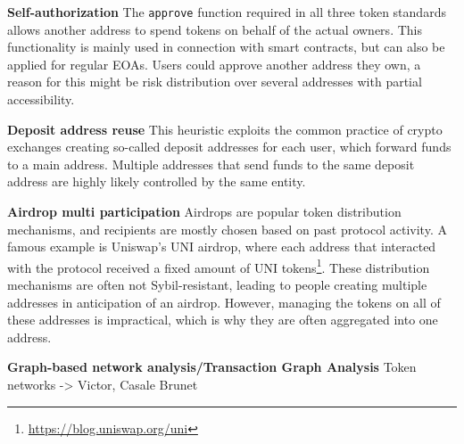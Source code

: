 \documentclass[12pt,a4paper,titlepage,oneside,english]{article}
\begin{document}
\textbf{Self-authorization} \newline
The \texttt{approve} function required in all three token standards allows another address to spend tokens on behalf of the actual owners. This functionality is mainly used in connection with smart contracts, but can also be applied for regular EOAs. Users could approve another address they own, a reason for this might be risk distribution over several addresses with partial accessibility. \citep{FV:17}

\textbf{Deposit address reuse} \newline
This heuristic exploits the common practice of crypto exchanges creating so-called deposit addresses for each user, which forward funds to a main address. Multiple addresses that send funds to the same deposit address are highly likely controlled by the same entity. \citep{FV:17}

\textbf{Airdrop multi participation} \newline
Airdrops are popular token distribution mechanisms, and recipients are mostly chosen based on past protocol activity. A famous example is Uniswap's UNI airdrop, where each address that interacted with the protocol received a fixed amount of UNI tokens\footnote{\url{https://blog.uniswap.org/uni}}. These distribution mechanisms are often not Sybil-resistant, leading to people creating multiple addresses in anticipation of an airdrop. However, managing the tokens on all of these addresses is impractical, which is why they are often aggregated into one address. \citep{FV:17}

\textbf{Graph-based network analysis/Transaction Graph Analysis}\newline
Token networks -> Victor, Casale Brunet

\end{document}
